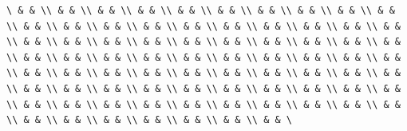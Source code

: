 \documentclass[
  ukrainian,
]{article}
\begin{document}
\begin{verbatim}
\ & & \\ & & \\ & & \\ & & \\ & & \\ & & \\ & & \\ & & \\ & & \\ & & \\ & & \\ & & \\ & & \\ & & \\ & & \\ & & \\ & & \\ & & \\ & & \\ & & \\ & & \\ & & \\ & & \\ & & \\ & & \\ & & \\ & & \\ & & \\ & & \\ & & \\ & & \\ & & \\ & & \\ & & \\ & & \\ & & \\ & & \\ & & \\ & & \\ & & \\ & & \\ & & \\ & & \\ & & \\ & & \\ & & \\ & & \\ & & \\ & & \\ & & \\ & & \\ & & \\ & & \\ & & \\ & & \\ & & \\ & & \\ & & \\ & & \\ & & \\ & & \\ & & \\ & & \\ & & \\ & & \\ & & \\ & & \\ & & \\ & & \\ & & \\ & & \\ & & \\ & & \\ & & \\ & & \\ & & \\ & & \
\end{verbatim}
\end{document}
